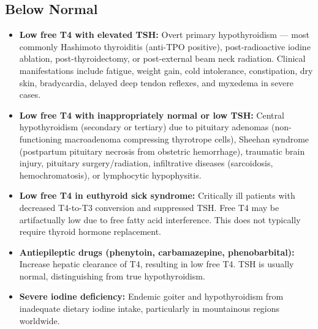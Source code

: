 \subsection*{Below Normal}
\begin{itemize}
  \item \textbf{Low free T4 with elevated TSH:} Overt primary hypothyroidism --- most commonly Hashimoto thyroiditis (anti-TPO positive), post-radioactive iodine ablation, post-thyroidectomy, or post-external beam neck radiation. Clinical manifestations include fatigue, weight gain, cold intolerance, constipation, dry skin, bradycardia, delayed deep tendon reflexes, and myxedema in severe cases.
  \item \textbf{Low free T4 with inappropriately normal or low TSH:} Central hypothyroidism (secondary or tertiary) due to pituitary adenomas (non-functioning macroadenoma compressing thyrotrope cells), Sheehan syndrome (postpartum pituitary necrosis from obstetric hemorrhage), traumatic brain injury, pituitary surgery/radiation, infiltrative diseases (sarcoidosis, hemochromatosis), or lymphocytic hypophysitis.
  \item \textbf{Low free T4 in euthyroid sick syndrome:} Critically ill patients with decreased T4-to-T3 conversion and suppressed TSH. Free T4 may be artifactually low due to free fatty acid interference. This does not typically require thyroid hormone replacement.
  \item \textbf{Antiepileptic drugs (phenytoin, carbamazepine, phenobarbital):} Increase hepatic clearance of T4, resulting in low free T4. TSH is usually normal, distinguishing from true hypothyroidism.
  \item \textbf{Severe iodine deficiency:} Endemic goiter and hypothyroidism from inadequate dietary iodine intake, particularly in mountainous regions worldwide.
\end{itemize}

